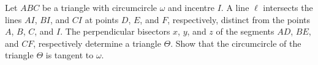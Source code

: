 Let $ABC$ be a triangle with circumcircle $\omega$ and incentre $I$. A line $\ell$ intersects the lines $AI$, $BI$, and $CI$ at points $D$, $E$, and $F$, respectively, distinct from the points $A$, $B$, $C$, and $I$. The perpendicular bisectors $x$, $y$, and $z$ of the segments $AD$, $BE$, and $CF$, respectively determine a triangle $\Theta$. Show that the circumcircle of the triangle $\Theta$ is tangent to $\omega$.

